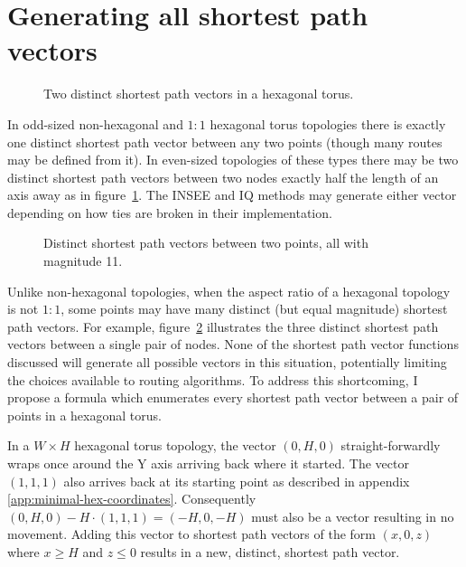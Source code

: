 	\section{Generating all shortest path vectors}
			
			\begin{figure}
				\center
				
				\caption{Two distinct shortest path vectors in a hexagonal torus.}
				\label{fig:wrap-alternatives}
			\end{figure}
			
			In odd-sized non-hexagonal and $1:1$ hexagonal torus topologies there is
			exactly one distinct shortest path vector between any two points (though
			many routes may be defined from it). In even-sized topologies of these
			types there may be two distinct shortest path vectors between two nodes
			exactly half the length of an axis away as in
			figure~\ref{fig:wrap-alternatives}. The INSEE and IQ methods may generate
			either vector depending on how ties are broken in their implementation.
			
			\begin{figure}
				\center
				
				\caption[Distinct shortest path vectors in non-square topologies.]%
				{Distinct shortest path vectors between two points, all with
				magnitude 11.}
				\label{fig:spiralling}
			\end{figure}
			
			Unlike non-hexagonal topologies, when the aspect ratio of a hexagonal
			topology is not $1:1$, some points may have many distinct (but equal
			magnitude) shortest path vectors.  For example, figure~\ref{fig:spiralling} illustrates the three distinct shortest path vectors
			between a single pair of nodes. None of the shortest path vector
			functions discussed will generate all possible vectors in this situation,
			potentially limiting the choices available to routing algorithms.  To
			address this shortcoming, I propose a formula which enumerates every
			shortest path vector between a pair of points in a hexagonal torus.
			
			In a $W \times H$ hexagonal torus topology, the vector $(0, H, 0)$
			straight-forwardly wraps once around the Y axis arriving back where it
			started. The vector $(1,1,1)$ also arrives back at its starting point as
			described in appendix \ref{app:minimal-hex-coordinates}. Consequently
			$(0,H,0) - H\cdot(1,1,1) = (-H, 0, -H)$ must also be a vector resulting
			in no movement.  Adding this vector to shortest path vectors of the form
			$(x, 0, z)$ where $x\ge H$ and $z\le0$ results in a new, distinct,
			shortest path vector.
			
